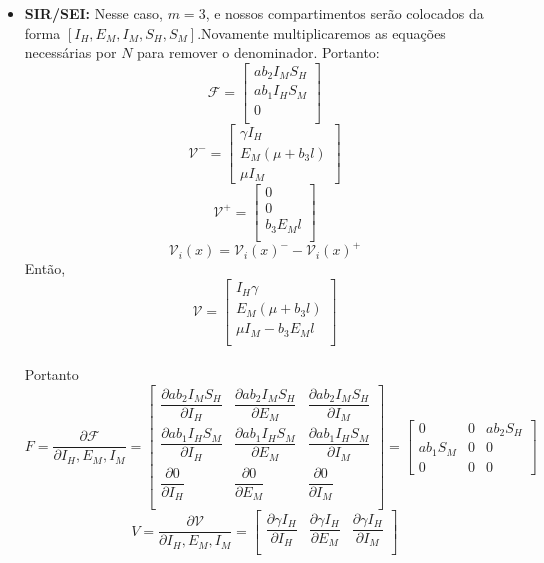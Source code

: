 \begin{itemize}
\item \textbf{SIR/SEI:}
Nesse caso, $m=3$, e nossos compartimentos serão colocados da forma $[I_H, E_M, I_M, S_H, S_M]$.Novamente multiplicaremos as equações necessárias por $N$ para remover o denominador. Portanto:
$$ {\mathcal F} =\begin{bmatrix}
a  b_2  I_M  S_H \\
a b_1 I_H S_M\\
0\\
\end{bmatrix} $$
$$
{\mathcal V^-} = \begin{bmatrix}
\gamma I_H\\
E_M (\mu + b_3 l)\\
\mu I_M
\end{bmatrix}
$$
$$
{\mathcal V^+} = \begin{bmatrix}
0\\
0\\
b_3 E_M l\\
\end{bmatrix}
$$
$${\mathcal V}_i (x) = {\mathcal V}_i(x)^{-} - {\mathcal V}_i(x)^+$$
Então,
$$
{\mathcal V} =
\begin{bmatrix}
I_H \gamma \\
E_M (\mu + b_3 l)\\
\mu I_M - b_3 E_M l\\
\end{bmatrix}
$$
\\
Portanto
$$ F = \dfrac{\partial{\mathcal F}}{\partial I_H, E_M, I_M} =\begin{bmatrix}
\dfrac{\partial ab_2 I_M S_H}{\partial I_H} & \dfrac{\partial ab_2 I_M S_H}{\partial E_M} & \dfrac{\partial ab_2 I_M S_H}{\partial I_M}\\
\dfrac{\partial ab_1 I_H S_M}{\partial I_H} & \dfrac{\partial ab_1 I_H S_M}{\partial E_M} & \dfrac{\partial ab_1 I_H S_M}{\partial I_M}\\
\dfrac{\partial 0}{\partial I_H} & \dfrac{\partial 0}{\partial E_M} & \dfrac{\partial 0}{\partial I_M}\\
\end{bmatrix} = 
\begin{bmatrix}
0 & 0 & ab_2 S_H\\
ab_1 S_M & 0 & 0\\
0 & 0 & 0
\end{bmatrix}$$
$$ V = \dfrac{\partial{\mathcal V}}{\partial I_H, E_M, I_M} =\begin{bmatrix}
\dfrac{\partial \gamma I_H}{\partial I_H} & \dfrac{\partial \gamma I_H}{\partial E_M} & \dfrac{\partial \gamma I_H}{\partial I_M}\\

\end{bmatrix}$$
\end{itemize}
